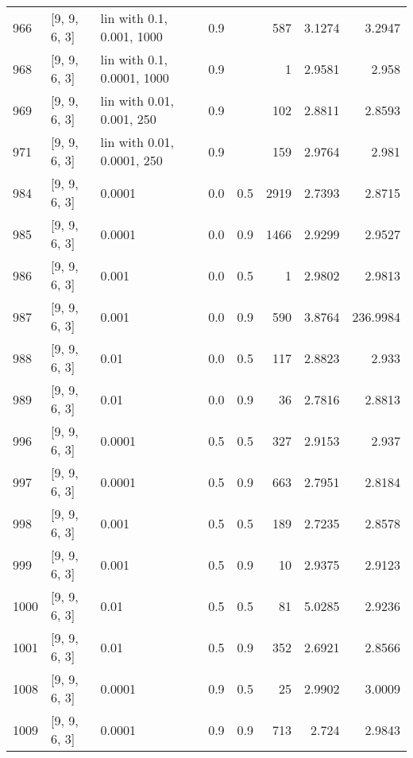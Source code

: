 \begin{longtable}{lllrrrrr}
  966 &       [9, 9, 6, 3] &   lin with 0.1, 0.001, 1000 &      0.9 &     &  587 &   3.1274 &   3.2947 \\
  968 &       [9, 9, 6, 3] &  lin with 0.1, 0.0001, 1000 &      0.9 &     &    1 &   2.9581 &    2.958 \\
  969 &       [9, 9, 6, 3] &   lin with 0.01, 0.001, 250 &      0.9 &     &  102 &   2.8811 &   2.8593 \\
  971 &       [9, 9, 6, 3] &  lin with 0.01, 0.0001, 250 &      0.9 &     &  159 &   2.9764 &    2.981 \\
  984 &       [9, 9, 6, 3] &                      0.0001 &      0.0 & 0.5 & 2919 &   2.7393 &   2.8715 \\
  985 &       [9, 9, 6, 3] &                      0.0001 &      0.0 & 0.9 & 1466 &   2.9299 &   2.9527 \\
  986 &       [9, 9, 6, 3] &                       0.001 &      0.0 & 0.5 &    1 &   2.9802 &   2.9813 \\
  987 &       [9, 9, 6, 3] &                       0.001 &      0.0 & 0.9 &  590 &   3.8764 & 236.9984 \\
  988 &       [9, 9, 6, 3] &                        0.01 &      0.0 & 0.5 &  117 &   2.8823 &    2.933 \\
  989 &       [9, 9, 6, 3] &                        0.01 &      0.0 & 0.9 &   36 &   2.7816 &   2.8813 \\
  996 &       [9, 9, 6, 3] &                      0.0001 &      0.5 & 0.5 &  327 &   2.9153 &    2.937 \\
  997 &       [9, 9, 6, 3] &                      0.0001 &      0.5 & 0.9 &  663 &   2.7951 &   2.8184 \\
  998 &       [9, 9, 6, 3] &                       0.001 &      0.5 & 0.5 &  189 &   2.7235 &   2.8578 \\
  999 &       [9, 9, 6, 3] &                       0.001 &      0.5 & 0.9 &   10 &   2.9375 &   2.9123 \\
 1000 &       [9, 9, 6, 3] &                        0.01 &      0.5 & 0.5 &   81 &   5.0285 &   2.9236 \\
 1001 &       [9, 9, 6, 3] &                        0.01 &      0.5 & 0.9 &  352 &   2.6921 &   2.8566 \\
 1008 &       [9, 9, 6, 3] &                      0.0001 &      0.9 & 0.5 &   25 &   2.9902 &   3.0009 \\
 1009 &       [9, 9, 6, 3] &                      0.0001 &      0.9 & 0.9 &  713 &    2.724 &   2.9843 \\

\end{longtable}
